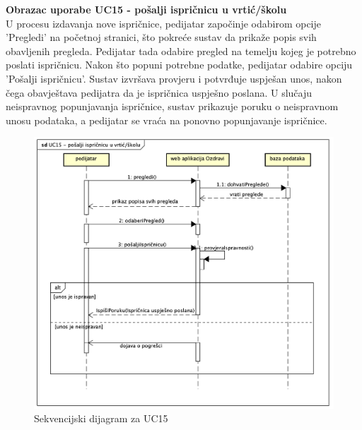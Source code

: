 				\noindent\textbf{Obrazac uporabe UC15 - pošalji ispričnicu u vrtić/školu}\\
				U procesu izdavanja nove ispričnice, pedijatar započinje odabirom opcije 'Pregledi' 
				na početnoj stranici, što pokreće sustav da prikaže popis svih obavljenih pregleda. 
				Pedijatar tada odabire pregled na temelju kojeg je potrebno poslati ispričnicu. Nakon 
				što popuni potrebne podatke, pedijatar odabire opciju 'Pošalji ispričnicu'. Sustav 
				izvršava provjeru i potvrđuje uspješan unos, nakon čega obavještava pedijatra da je 
				ispričnica uspješno poslana. U slučaju neispravnog popunjavanja ispričnice, sustav 
				prikazuje poruku o neispravnom unosu podataka, a pedijatar se vraća na ponovno 
				popunjavanje ispričnice. \\

				\begin{figure}[H]
						\includegraphics[width=\textwidth]{slike/sduc15.png} 
						\caption{Sekvencijski dijagram za UC15}
				\end{figure}

				\eject


	
